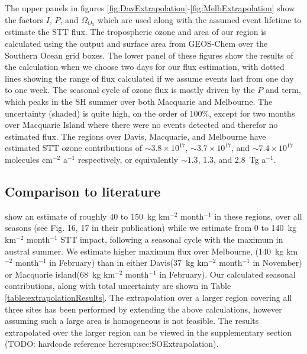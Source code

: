 \documentclass[acp, manuscript]{copernicus} %
\begin{document}
    The upper panels in figures \ref{fig:DavExtrapolation}-\ref{fig:MelbExtrapolation} show the factors $I$, $P$, and $\Omega_{O_3}$ which are used along with the assumed event lifetime to estimate the STT flux.
    The tropospheric ozone and area of our region is calculated using the output and surface area from GEOS-Chem over the Southern Ocean grid boxes.
    The lower panel of these figures show the results of the calculation when we choose two days for our flux estimation, with dotted lines showing the range of flux calculated if we assume events last from one day to one week.
    The seasonal cycle of ozone flux is mostly driven by the $P$ and term, which peaks in the SH summer over both Macquarie and Melbourne.
    The uncertainty (shaded) is quite high, on the order of $100\%$, except for two months over Macquarie Island where there were no events detected and therefor no estimated flux.
    The regions over Davis, Macquarie, and Melbourne have estimated STT ozone contributions of $\sim 3.8 \times 10^{17}$, $\sim 3.7 \times 10^{17}$, and $\sim 7.4 \times 10^{17}$ molecules cm$^{-2}$ a$^{-1}$ respectively, or equivalently $\sim 1.3$, 1.3, and 2.8~Tg a$^{-1}$.
  
  \subsection{Comparison to literature}
    \cite{Skerlak2014} show an estimate of roughly 40 to 150~kg km$^{-2}$ month$^{-1}$ in these regions, over all seasons (see Fig. 16, 17 in their publication) while we estimate from 0 to 140~kg km$^{-2}$ month$^{-1}$ STT impact, following a seasonal cycle with the maximum in austral summer.
    We estimate higher maximum flux over Melbourne, (140~kg km$^{-2}$ month$^{-1}$ in February) than in either Davis(37~kg km$^{-2}$ month$^{-1}$ in November) or Macquarie island(68~kg km$^{-2}$ month$^{-1}$ in February).
    Our calculated seasonal contributions, along with total uncertainty are shown in Table \ref{table:extrapolationResults}.
    The extrapolation over a larger region covering all three sites has been performed by extending the above calculations, however assuming such a large area is homogeneous is not feasible.
    The results extrapolated over the larger region can be viewed in the supplementary section (TODO: hardcode reference here{sup:sec:SOExtrapolation}).
    
\end{document}
